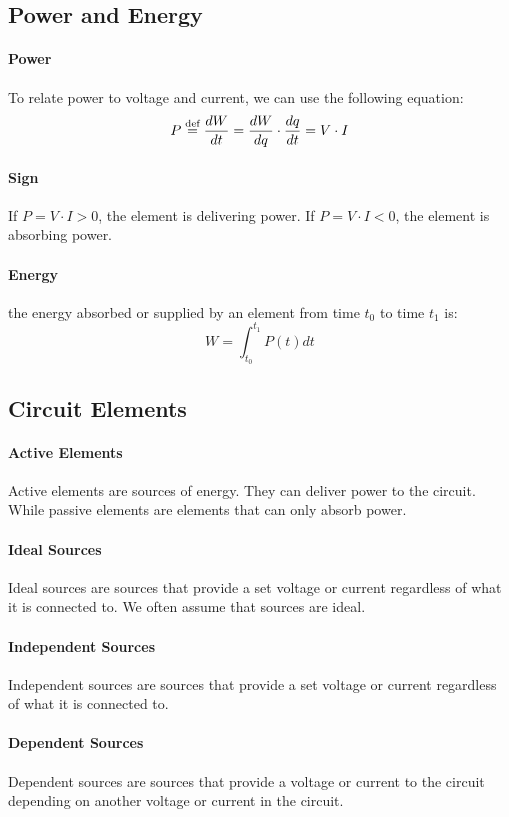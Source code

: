 \documentclass[11pt]{article}
\begin{document}
\subsection{Power and Energy}
\paragraph{Power} To relate power to  voltage and current, we can use the following equation:
\begin{equation}
    P \stackrel{\text{def}}{=} \frac{dW}{dt} = \frac{dW}{dq} \cdot \frac{dq}{dt} = V \cdot I
\end{equation}
\paragraph{Sign} If $P = V \cdot I > 0$, the element is delivering power. If $P = V \cdot I < 0$, the element is absorbing power.
\paragraph{Energy}  the energy absorbed or supplied by an element
from time $t_0$ to time $t_1$ is:
\begin{equation}
    W = \int_{t_0}^{t_1} P(t) dt
\end{equation}
\subsection{Circuit Elements}
\paragraph{Active Elements} Active elements are sources of energy. They can deliver power to the circuit. While passive elements are elements that can only absorb power.
\paragraph{Ideal Sources} Ideal sources are sources that provide a set voltage or current regardless of what it is connected to. We often assume that sources are ideal.
\paragraph{Independent Sources} Independent sources are sources that provide a set voltage or current regardless of what it is connected to.
\paragraph{Dependent Sources} Dependent sources are sources that provide a voltage or current to the circuit depending on another voltage or current in the circuit.
\end{document}
